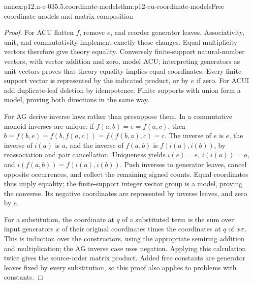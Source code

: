 \begin{annexitem}{annex:p12.n-c-035.5.coordinate-models}{thm:p12-eu-coordinate-models}{Free coordinate models and matrix composition}
\begin{proof}
For ACU flatten \(f\), remove \(e\), and reorder generator leaves.
Associativity, unit, and commutativity implement exactly these changes.
Equal multiplicity vectors therefore give theory equality. Conversely
finite-support natural-number vectors, with vector addition and zero,
model ACU; interpreting generators as unit vectors proves that theory
equality implies equal coordinates. Every finite-support vector is
represented by the indicated product, or by \(e\) if zero.
For ACUI add duplicate-leaf deletion by idempotence. Finite supports
with union form a model, proving both directions in the same way.

For AG derive inverse laws rather than presuppose them. In a commutative
monoid inverses are unique: if \(f(a,b)=e=f(a,c)\), then
\(b=f(b,e)=f(b,f(a,c))=f(f(b,a),c)=c\).
The inverse of \(e\) is \(e\), the inverse of \(i(a)\) is \(a\),
and the inverse of \(f(a,b)\) is \(f(i(a),i(b))\), by reassociation
and pair cancellation. Uniqueness yields \(i(e)=e\),
\(i(i(a))=a\), and \(i(f(a,b))=f(i(a),i(b))\).
Push inverses to generator leaves, cancel opposite occurrences, and
collect the remaining signed counts. Equal coordinates thus imply
equality; the finite-support integer vector group is a model, proving
the converse. Its negative coordinates are represented by inverse
leaves, and zero by \(e\).

For a substitution, the coordinate at \(q\) of a substituted term
is the sum over input generators \(x\) of their original coordinates
times the coordinates at \(q\) of \(x\sigma\). This is induction
over the constructors, using the appropriate semiring addition and
multiplication; the AG inverse case uses negation. Applying this
calculation twice gives the source-order matrix product. Added free
constants are generator leaves fixed by every substitution, so this
proof also applies to problems with constants.
\end{proof}
\end{annexitem}

